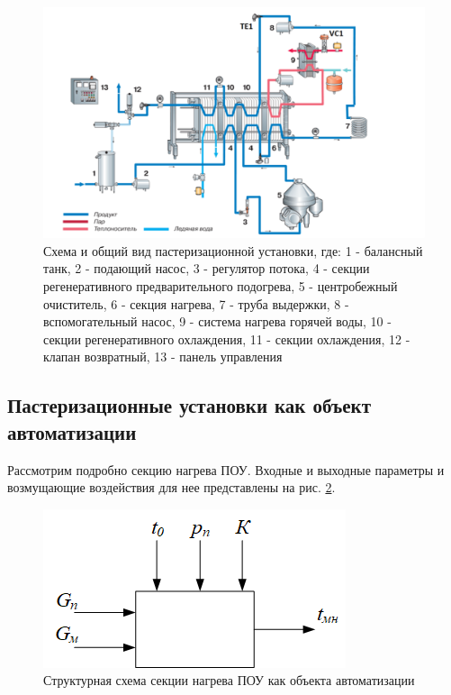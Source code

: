\begin{figure}[H]
    \centering
    \includegraphics[width=\textwidth]{images/chapter_2/ПОУ Tetra Pak.png}
    \caption{Схема и общий вид пастеризационной установки, где: 1 - балансный танк, 2 - подающий насос, 3 - регулятор потока, 4 - секции регенеративного предварительного подогрева, 5 - центробежный очиститель, 6 - секция нагрева, 7 - труба выдержки, 8 - вспомогательный насос, 9 - система нагрева горячей воды, 10 - секции регенеративного охлаждения, 11 - секции охлаждения, 12 - клапан возвратный, 13 - панель управления}
    \label{fig:POU_Tetra_Pak}
\end{figure}

\subsection{Пастеризационные установки как объект автоматизации}

Рассмотрим подробно секцию нагрева ПОУ. Входные и выходные параметры и возмущающие воздействия для нее представлены на рис. \ref{fig:Pasterizer_heat_section}.

\begin{figure}[H]
    \centering
    \includegraphics{images/chapter_2/Pasterizer_heat_section.png}
    \caption{Структурная схема секции нагрева ПОУ как объекта автоматизации}
    \label{fig:Pasterizer_heat_section}
\end{figure}

